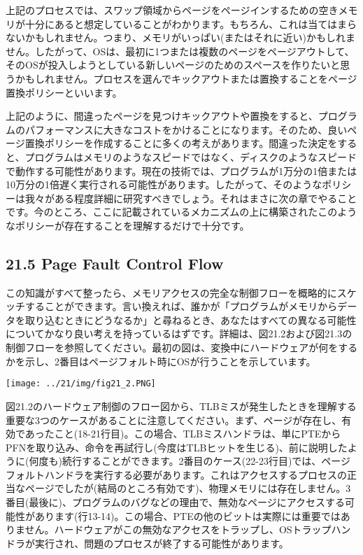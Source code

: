 上記のプロセスでは、スワップ領域からページをページインするための空きメモリが十分にあると想定していることがわかります。もちろん、これは当てはまらないかもしれません。つまり、メモリがいっぱい(またはそれに近い)かもしれません。したがって、OSは、最初に1つまたは複数のページをページアウトして、そのOSが投入しようとしている新しいページのためのスペースを作りたいと思うかもしれません。プロセスを選んでキックアウトまたは置換することをページ置換ポリシーといいます。

上記のように、間違ったページを見つけキックアウトや置換をすると、プログラムのパフォーマンスに大きなコストをかけることになります。そのため、良いページ置換ポリシーを作成することに多くの考えがあります。間違った決定をすると、プログラムはメモリのようなスピードではなく、ディスクのようなスピードで動作する可能性があります。現在の技術では、プログラムが1万分の1倍または10万分の1倍遅く実行される可能性があります。したがって、そのようなポリシーは我々がある程度詳細に研究すべきでしょう。それはまさに次の章でやることです。今のところ、ここに記載されているメカニズムの上に構築されたこのようなポリシーが存在することを理解するだけで十分です。

\hypertarget{page-fault-control-flow}{%
\subsection*{21.5 Page Fault Control
Flow}\label{page-fault-control-flow}}

この知識がすべて整ったら、メモリアクセスの完全な制御フローを概略的にスケッチすることができます。言い換えれば、誰かが「プログラムがメモリからデータを取り込むときにどうなるか」と尋ねるとき、あなたはすべての異なる可能性についてかなり良い考えを持っているはずです。詳細は、図21.2および図21.3の制御フローを参照してください。最初の図は、変換中にハードウェアが何をするかを示し、2番目はページフォルト時にOSが行うことを示しています。

\texttt{[image: ../21/img/fig21\_2.PNG]}

図21.2のハードウェア制御のフロー図から、TLBミスが発生したときを理解する重要な3つのケースがあることに注意してください。まず、ページが存在し、有効であったこと(18-21行目)。この場合、TLBミスハンドラは、単にPTEからPFNを取り込み、命令を再試行し(今度はTLBヒットを生じる)、前に説明したように(何度も)続行することができます。2番目のケース(22-23行目)では、ページフォルトハンドラを実行する必要があります。これはアクセスするプロセスの正当なページでしたが(結局のところ有効です)、物理メモリには存在しません。3番目(最後に)、プログラムのバグなどの理由で、無効なページにアクセスする可能性があります(行13-14)。この場合、PTEの他のビットは実際には重要ではありません。ハードウェアがこの無効なアクセスをトラップし、OSトラップハンドラが実行され、問題のプロセスが終了する可能性があります。

